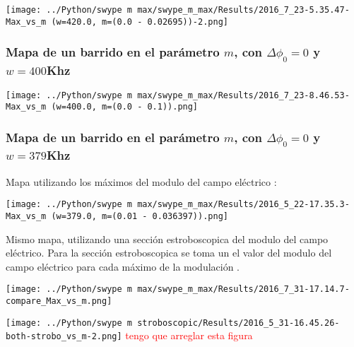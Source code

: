 			\begin{center}
				\texttt{[image: ../Python/swype m max/swype\_m\_max/Results/2016\_7\_23-5.35.47-Max\_vs\_m (w=420.0, m=(0.0 - 0.02695))-2.png]}
				\label{fig: mapa m 420 zoom}
			\end{center}		
	
		
		\subsubsection{Mapa de un barrido en el parámetro $m$, con $\Delta \phi_0 = 0 $ y $w=400$Khz}
		
			\begin{center}
				\texttt{[image: ../Python/swype m max/swype\_m\_max/Results/2016\_7\_23-8.46.53-Max\_vs\_m (w=400.0, m=(0.0 - 0.1)).png]}
				\label{fig: mapa m 400 }
			\end{center}
			
	
		\subsubsection{Mapa de un barrido en el parámetro $m$, con $\Delta \phi_0 =0 $ y $w=379$Khz}
		
			Mapa utilizando los máximos del modulo del campo eléctrico :
			
			\begin{center}
				\texttt{[image: ../Python/swype m max/swype\_m\_max/Results/2016\_5\_22-17.35.3-Max\_vs\_m (w=379.0, m=(0.01 - 0.036397)).png]}
				\label{fig: mapa m 379}
			\end{center}
			
			Mismo mapa, utilizando una sección estroboscopica del modulo del campo eléctrico.
			Para la sección estroboscopica se toma un el valor del modulo del campo eléctrico para cada máximo de la modulación .
				
			\begin{center}
				\texttt{[image: ../Python/swype m max/swype\_m\_max/Results/2016\_7\_31-17.14.7-compare\_Max\_vs\_m.png]}
				\label{fig: mapa m 379 colores}
			\end{center}
					
			\begin{center}
				\texttt{[image: ../Python/swype m stroboscopic/Results/2016\_5\_31-16.45.26-both-strobo\_vs\_m-2.png]}
				\label{fig: swype m 379 strobo histeresis}
				\textcolor{red}{tengo que arreglar esta figura}
			\end{center}
			
